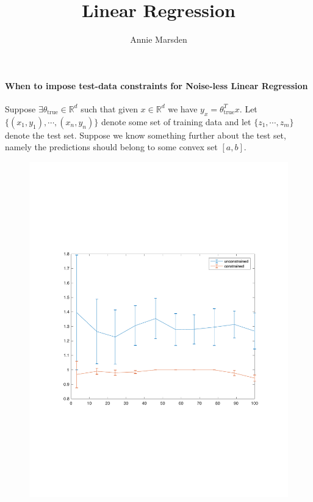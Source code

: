 \documentclass[12pt]{article}
\title{Linear Regression}
\author{Annie Marsden}
\begin{document}
\paragraph{When to impose test-data constraints for Noise-less Linear Regression}

Suppose $\exists \theta_{\textrm{true}} \in \mathbb{R}^{d}$ such that given $x \in \mathbb{R}^{d}$ we have $y_{x} = \theta_{\textrm{true}}^{T}x$. Let $\{ (x_{1}, y_{1}), \cdots, (x_{n},y_{n}) \}$ denote some set of training data and let $\{z_{1}, \cdots, z_{m} \}$ denote the test set. Suppose we know something further about the test set, namely the predictions should belong to some convex set $[a,b]$.
\begin{figure}
    \begin{minipage}{\linewidth}
    \centering\captionsetup[subfigure]{justification=centering}
    \includegraphics[width=\linewidth]{figure_7_7bound.pdf}
    \label{fig:5a}\par\vfill

\end{minipage}
\end{figure}
\end{document}
